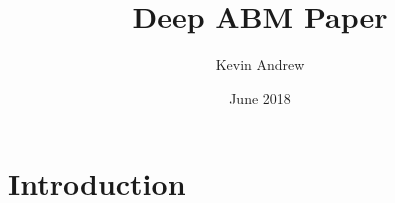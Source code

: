\documentclass{article}
\title{Deep ABM Paper}
\author{Kevin Andrew}
\date{June 2018}
\begin{document}
\maketitle

\section{Introduction}
\end{document}
